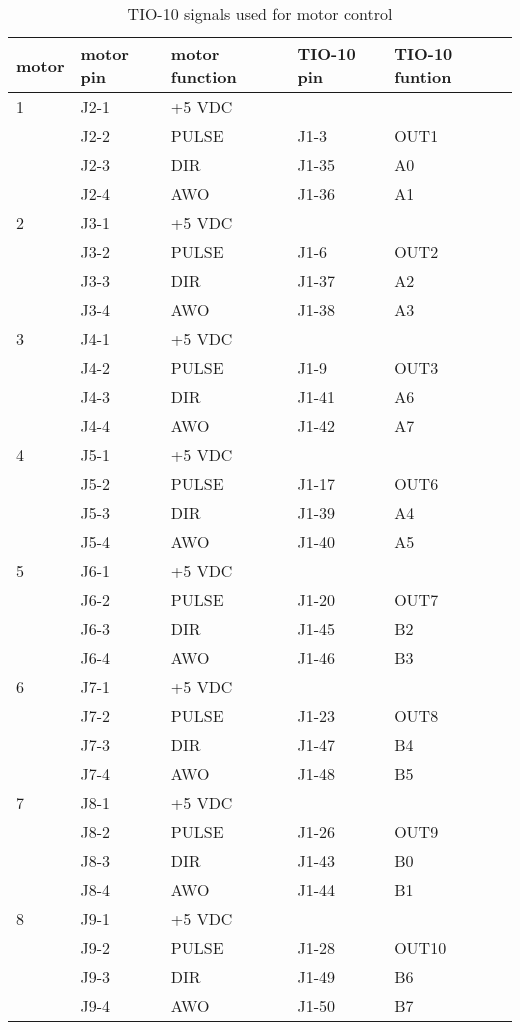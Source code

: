 \begin{table}[htb]
\begin{center}
\begin{tabular}{|l|l|l|l|l|}
\hline
motor & motor pin & motor function& TIO-10 pin & TIO-10 funtion \\
\hline
1 & J2-1 & +5 VDC         &       & \\
  & J2-2 & PULSE          & J1-3  & OUT1\\
  & J2-3 & DIR            & J1-35 & A0\\
  & J2-4 & AWO            & J1-36 & A1\\
\hline
2 & J3-1 & +5 VDC         &       & \\
  & J3-2 & PULSE          & J1-6  & OUT2\\
  & J3-3 & DIR            & J1-37 & A2\\
  & J3-4 & AWO            & J1-38 & A3\\
\hline
3 & J4-1 & +5 VDC         &       & \\
  & J4-2 & PULSE          & J1-9  & OUT3\\
  & J4-3 & DIR            & J1-41 & A6\\
  & J4-4 & AWO            & J1-42 & A7\\
\hline
4 & J5-1 & +5 VDC         &       & \\
  & J5-2 & PULSE          & J1-17 & OUT6\\
  & J5-3 & DIR            & J1-39 & A4\\
  & J5-4 & AWO            & J1-40 & A5\\
\hline
5 & J6-1 & +5 VDC         &       & \\
  & J6-2 & PULSE          & J1-20 & OUT7\\
  & J6-3 & DIR            & J1-45 & B2\\
  & J6-4 & AWO            & J1-46 & B3\\
\hline
6 & J7-1 & +5 VDC         &       & \\
  & J7-2 & PULSE          & J1-23 & OUT8\\
  & J7-3 & DIR            & J1-47 & B4\\
  & J7-4 & AWO            & J1-48 & B5\\
\hline
7 & J8-1 & +5 VDC         &       & \\
  & J8-2 & PULSE          & J1-26 & OUT9\\
  & J8-3 & DIR            & J1-43 & B0\\
  & J8-4 & AWO            & J1-44 & B1\\
\hline
8 & J9-1 & +5 VDC         &       & \\
  & J9-2 & PULSE          & J1-28 & OUT10\\
  & J9-3 & DIR            & J1-49 & B6\\
  & J9-4 & AWO            & J1-50 & B7\\
\hline
\end{tabular}
\caption[TIO-10 signals used for motor control]
        {TIO-10 signals used for motor control
        }
\end{center}
\end{table}
  
